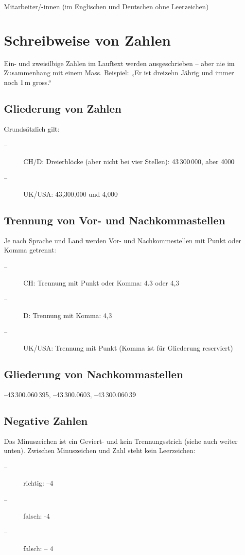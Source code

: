 Mitarbeiter/-innen (im Englischen und Deutschen ohne Leerzeichen)

\section{Schreibweise von Zahlen}

Ein- und zweisilbige Zahlen im Lauftext werden ausgeschrieben -- aber nie im Zusammenhang mit einem Mass. Beispiel: „Er ist dreizehn Jährig und immer noch 1\,m gross.“

\subsection{Gliederung von Zahlen}

Grundsätzlich gilt:
\begin{description}
  \item[--] CH/D: Dreierblöcke (aber nicht bei vier Stellen): 43\,300\,000, aber 4000
  \item[--] UK/USA: 43,300,000 und 4,000
\end{description}

\subsection{Trennung von Vor- und Nachkommastellen}

Je nach Sprache und Land werden Vor- und Nachkommestellen mit Punkt oder Komma getrennt: 
\begin{description}
  \item[--] CH: Trennung mit Punkt oder Komma: 4.3 oder 4,3
  \item[--] D: Trennung mit Komma: 4,3
  \item[--] UK/USA: Trennung mit Punkt (Komma ist für Gliederung reserviert)
\end{description}

\subsection{Gliederung von Nachkommastellen}
–43\,300.060\,395, –43\,300.0603, –43\,300.060\,39

\subsection{Negative Zahlen}

Das Minuszeichen ist ein Geviert- und kein Trennungsstrich (siehe auch weiter unten). Zwischen Minuszeichen und Zahl steht kein Leerzeichen:
\begin{description}
 \item[--] richtig: –4
 \item[--] falsch: -4
 \item[--] falsch: – 4
\end{description}

